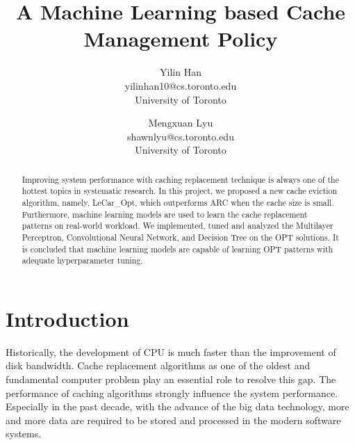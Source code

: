 \documentclass[letterpaper,twocolumn,10pt]{article}
\begin{document}

\date{}

\title{\Large \bf A Machine Learning based Cache Management Policy}

\author{
{\rm Yilin Han}\\
yilinhan10@cs.toronto.edu\\
University of Toronto
\and
{\rm Mengxuan Lyu}\\
shawnlyu@cs.toronto.edu\\
University of Toronto
} %

\maketitle

\begin{abstract}
Improving system performance with caching replacement technique is always one of the hottest topics in systematic research. In this project, we proposed a new cache eviction algorithm, namely, LeCar\_Opt, which outperforms ARC when the cache size is small. Furthermore, machine learning models are used to learn the cache replacement patterns on real-world workload. We implemented, tuned and analyzed the Multilayer Perceptron, Convolutional Neural Network, and Decision Tree on the OPT solutions. It is concluded that machine learning models are capable of learning OPT patterns with adequate hyperparameter tuning.


\end{abstract}


\section{Introduction}
Historically, the development of CPU is much faster than the improvement of disk bandwidth. Cache replacement algorithms as one of the oldest and fundamental computer problem play an essential role to resolve this gap. The performance of caching algorithms strongly influence the system performance. Especially in the past decade,  with the advance of the big data technology, more and more data are required to be stored and processed in the modern software systems. 
\end{document}
